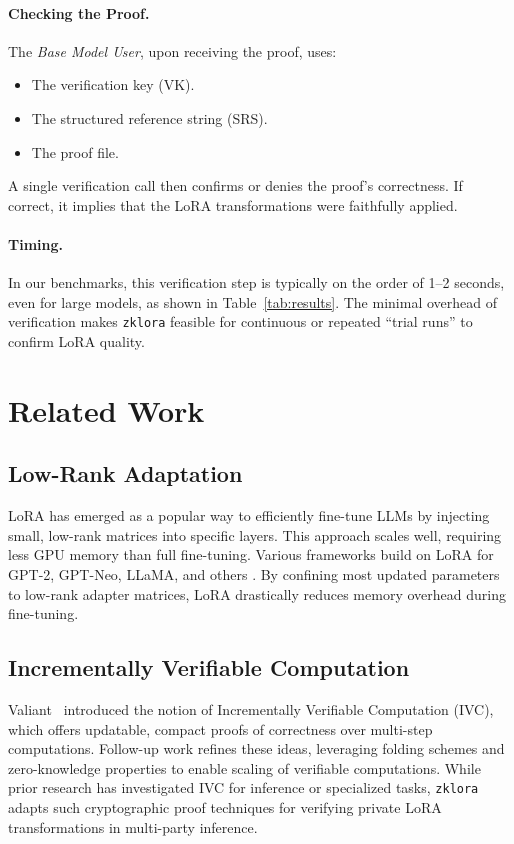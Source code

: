 \documentclass[11pt]{article}
\begin{document}
\paragraph{Checking the Proof.}
The \emph{Base Model User}, upon receiving the proof, uses:
\begin{itemize}
    \item The verification key (VK).
    \item The structured reference string (SRS).
    \item The proof file.
\end{itemize}
A single verification call then confirms or denies the proof’s correctness. If correct, it implies that the LoRA transformations were faithfully applied.

\paragraph{Timing.}
In our benchmarks, this verification step is typically on the order of 1–2 seconds, even for large models, as shown in Table~\ref{tab:results}. The minimal overhead of verification makes \texttt{zklora} feasible for continuous or repeated “trial runs” to confirm LoRA quality.



\section{Related Work}

\subsection{Low-Rank Adaptation}
LoRA \cite{hu2021lora} has emerged as a popular way to efficiently fine-tune LLMs by injecting small, low-rank matrices into specific layers. This approach scales well, requiring less GPU memory than full fine-tuning. Various frameworks build on LoRA for GPT-2, GPT-Neo, LLaMA, and others \cite{ding2022delta}. By confining most updated parameters to low-rank adapter matrices, LoRA drastically reduces memory overhead during fine-tuning.

\subsection{Incrementally Verifiable Computation}
Valiant~\cite{valiant2008incrementally} introduced the notion of Incrementally Verifiable Computation (IVC), which offers updatable, compact proofs of correctness over multi-step computations. Follow-up work \cite{kothapalli2022nova, kothapalli2024hypernova} refines these ideas, leveraging folding schemes and zero-knowledge properties to enable scaling of verifiable computations. While prior research has investigated IVC for inference or specialized tasks, \texttt{zklora} adapts such cryptographic proof techniques for verifying private LoRA transformations in multi-party inference.
\end{document}
